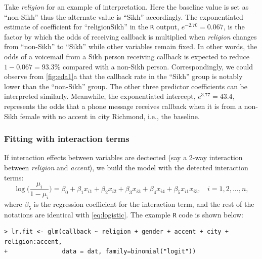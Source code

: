 \documentclass[11pt]{article}
\begin{document}
Take \textit{religion} for an example of interpretation. Here the baseline value is set as ``non-Sikh'' thus the alternate value is ``Sikh'' accordingly. The exponentiated estimate of coefficient for ``religionSikh'' in the \texttt{R} output, $e^{-2.70} = 0.067$, is the factor by which the odds of receiving callback is multiplied when \textit{religion} changes from ``non-Sikh'' to ``Sikh'' while other variables remain fixed. In other words, the odds of a voicemail from a Sikh person receiving callback is expected to reduce $1-0.067 = 93.3\%$ compared with a non-Sikh person. Correspondingly, we could observe from \autoref{fig:eda1}a that the callback rate in the ``Sikh'' group is notably lower than the ``non-Sikh'' group. The other three predictor coefficients can be interpreted similarly. Meanwhile, the exponentiated intercept, $e^{3.77} = 43.4$, represents the odds that a phone message receives callback when it is from a non-Sikh female with no accent in city Richmond, i.e., the baseline. 


\subsubsection{Fitting with interaction terms}
\label{sec:logistic_interact}
If interaction effects between variables are dectected (say a 2-way interaction between \textit{religion} and \textit{accent}), we build the model with the detected interaction terms:
\begin{equation}
    \log \bigg(\frac{\mu_i}{1-\mu_i}\bigg)  = \beta_0 + \beta_1x_{i1} + \beta_2x_{i2} + \beta_3x_{i3} + \beta_4x_{i4} + \beta_5 x_{i1}x_{i3},\ \ \ \ i=1,2,...,n,
    \label{eq:logistic2}
\end{equation}
where $\beta_5$ is the regression coefficient for the interaction term, and the rest of the notations are identical with \autoref{eq:logistic}. The example \texttt{R} code is shown below:
\begin{verbatim}
> lr.fit <- glm(callback ~ religion + gender + accent + city + religion:accent, 
+               data = dat, family=binomial("logit"))  
\end{verbatim}
\end{document}
